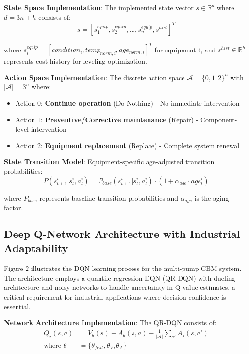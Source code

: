 \documentclass[twocolumn]{article}
\begin{document}
\textbf{State Space Implementation}: The implemented state vector $s \in \mathbb{R}^{d}$ where $d = 3n + h$ consists of:
\begin{equation}
s = [s_1^{equip}, s_2^{equip}, ..., s_n^{equip}, s^{hist}]^T
\end{equation}

where $s_i^{equip} = [condition_i, temp_{norm,i}, age_{norm,i}]^T$ for equipment $i$, and $s^{hist} \in \mathbb{R}^h$ represents cost history for leveling optimization.

\textbf{Action Space Implementation}: The discrete action space $\mathcal{A} = \{0, 1, 2\}^n$ with $|\mathcal{A}| = 3^n$ where:
\begin{itemize}
\item Action 0: \textbf{Continue operation} (Do Nothing) - No immediate intervention
\item Action 1: \textbf{Preventive/Corrective maintenance} (Repair) - Component-level intervention 
\item Action 2: \textbf{Equipment replacement} (Replace) - Complete system renewal
\end{itemize}

\textbf{State Transition Model}: Equipment-specific age-adjusted transition probabilities:
\begin{equation}
P(s_{t+1}^i | s_t^i, a_t^i) = P_{base}(s_{t+1}^i | s_t^i, a_t^i) \cdot (1 + \alpha_{age} \cdot age_t^i)
\end{equation}

where $P_{base}$ represents baseline transition probabilities and $\alpha_{age}$ is the aging factor.

\subsection{Deep Q-Network Architecture with Industrial Adaptability}

Figure 2 illustrates the DQN learning process for the multi-pump CBM system. The architecture employs a quantile regression DQN (QR-DQN) with dueling architecture and noisy networks to handle uncertainty in Q-value estimates, a critical requirement for industrial applications where decision confidence is essential.

\textbf{Network Architecture Implementation}: The QR-DQN consists of:
\begin{equation}
\begin{split}
Q_\theta(s,a) &= V_\theta(s) + A_\theta(s,a) - \frac{1}{|\mathcal{A}|}\sum_{a'} A_\theta(s,a') \\
\text{where } \theta &= \{\theta_{feat}, \theta_V, \theta_A\}
\end{split}
\end{equation}
\end{document}
